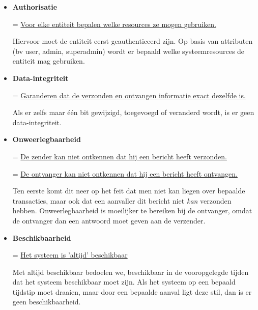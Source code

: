\documentclass{report}
\begin{document}
\begin{itemize}
		\item \textbf{Authorisatie}
		
		= \underline{Voor elke entiteit bepalen welke resources ze mogen gebruiken.}

		Hiervoor moet de entiteit eerst geauthenticeerd zijn. Op basis van attributen (bv user, admin, superadmin) wordt er bepaald welke systeemresources de entiteit mag gebruiken.

		\item \textbf{Data-integriteit}
		
		= \underline{Garanderen dat de verzonden en ontvangen informatie exact dezelfde is.}

		Als er zelfs maar één bit gewijzigd, toegevoegd of veranderd wordt, is er geen data-integriteit. 

		\item \textbf{Onweerlegbaarheid}
		
		= \underline{De zender kan niet ontkennen dat hij een bericht heeft verzonden.}

		= \underline{De ontvanger kan niet ontkennen dat hij een bericht heeft ontvangen.}

		Ten eerste komt dit neer op het feit dat men niet kan liegen over bepaalde transacties, maar ook dat een aanvaller dit bericht niet \emph{kan} verzonden hebben. Onweerlegbaarheid is moeilijker te bereiken bij de ontvanger, omdat de ontvanger dan een antwoord moet geven aan de verzender. 

		\item \textbf{Beschikbaarheid}
		
		= \underline{Het systeem is 'altijd' beschikbaar}

		Met altijd beschikbaar bedoelen we, beschikbaar in de vooropgelegde tijden dat het systeem beschikbaar moet zijn. Als het systeem op een bepaald tijdstip moet draaien, maar door een bepaalde aanval ligt deze stil, dan is er geen beschikbaarheid.
	\end{itemize}
\end{document}
